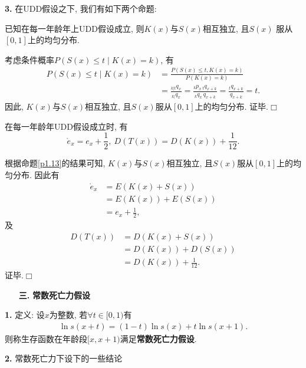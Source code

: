 \documentclass[a4paper,openany, 10pt]{ctexbook}
\newcommand{\hei}{\CJKfamily{hei}}      %
\def\qed{\hfill$\Box$\medskip}
\begin{document}
{\rm\bf3.} 在UDD假设之下, 我们有如下两个命题:

 \begin{proposition}\label{p1.13}已知在每一年龄年上UDD假设成立, 则$K(x)$与$S(x)$相互独立, 且$S(x)$ 服从
 $[0,1]$上的均匀分布.
\end{proposition}
\proof
考虑条件概率$P(S(x) \leq t \mid K(x) = k)$, 有
\begin{align*}
    P(S(x) \leq t \mid K(x) = k) & = \frac{P(S(x) \leq t, K(x) = k)}{P(K(x) = k)}                                                                          \\
                                 & = \frac{_{k|t}q_{x}}{_{k|}q_{x}} = \frac{_{k}p_{x}\,_{t}q_{x+k}}{_{k}q_{x}\,q_{x+k}} = \frac{_{t}q_{x+k}}{q_{x+k}} = t.
\end{align*}
因此, $K(x)$与$S(x)$相互独立, 且$S(x)$服从$[0,1]$上的均匀分布. 证毕.\qed

\begin{proposition}在每一年龄年UDD假设成立时, 有
    $$\mathring{e}_{x}=e_{x}+\frac{1}{2},\   D(T(x))=D(K(x))+\frac{1}{12}.$$
\end{proposition}
\proof
根据命题\ref{p1.13}的结果可知, $K(x)$与$S(x)$相互独立, 且$S(x)$服从$[0,1]$上的均匀分布. 因此有
\begin{align*}
    \mathring{e}_{x} & =E(K(x)+S(x))        \\
                     & = E(K(x))+E(S(x))    \\
                     & = e_{x}+\frac{1}{2},
\end{align*}
及\begin{align*}
    D(T(x)) & =D(K(x)+S(x))             \\
                     & =D(K(x))+D(S(x)) \\
                     & =D(K(x))+\frac{1}{12}.
\end{align*}
证毕.\qed

\begin{itemize}
    \item[{\bf\hei 三.}]{\bf\hei 常数死亡力假设}
\end{itemize}

{\rm\bf1.}  定义: 设$x$为整数, 若$\forall t\in [0,1)$有
\begin{align}\label{tulb}
    \ln s(x+t)=(1-t)\ln s(x)+t\ln s(x+1).
\end{align}
则称生存函数在年龄段$[x,x+1)$满足\textbf{常数死亡力假设}.

{\rm\bf2.} 常数死亡力下设下的一些结论
\end{document}
